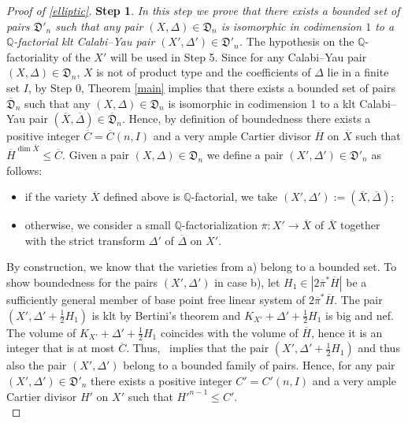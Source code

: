 \documentclass{amsart}[12pt,a4paper]
\theoremstyle{definition}
\begin{document}
\begin{proof}[Proof of \ref{elliptic}]
{\bf Step 1}. {\it In this step we prove that there exists a bounded set of pairs $\mathfrak{D}'_n$ such that any pair $(X, \Delta) \in \mathfrak{D}_n$ is isomorphic in codimension $1$ to a $\mathbb{Q}$-factorial klt Calabi--Yau pair $(X', \Delta') \in \mathfrak{D}'_n$.}
\newline
The hypothesis on the $\mathbb{Q}$-factoriality of the $X'$ will be used in Step 5.
\newline
Since for any Calabi--Yau pair $(X, \Delta) \in \mathfrak{D}_n$, $X$ is not of product type and the coefficients of $\Delta$ lie in a finite set $I$, by Step 0, Theorem \ref{main} implies that there exists a bounded set of pairs $\overline{\mathfrak{D}}_n$ such that any $(X, \Delta) \in \mathfrak{D}_n$ is isomorphic in codimension 1 to a klt Calabi--Yau pair $(\overline{X}, \overline{\Delta}) \in \overline{\mathfrak{D}}_n$.
Hence, by definition of boundedness there exists a positive integer $\overline{C} = \overline{C}(n, I)$ and a very ample Cartier divisor $\overline{H}$ on $\overline{X}$ such that $\overline{H}^{\dim \overline{X}} \leq \overline{C}$.
Given a pair $(X, \Delta) \in \mathfrak{D}_n$ we define a pair $(X', \Delta') \in \mathfrak{D}'_n$ as follows:
\begin{itemize}
\item[a)] if the variety $\overline{X}$ defined above is $\mathbb{Q}$-factorial, we take $(X', \Delta') := (\overline{X}, \overline{\Delta})$;
\item[b)] otherwise, we consider a small $\mathbb{Q}$-factorialization $\overline{\pi} \colon X' \to \overline{X}$ of $\overline{X}$ together with the strict transform $\Delta'$ of $\overline{\Delta}$ on $X'$.
\end{itemize}
By construction, we know that the varieties from a) belong to a bounded set.
To show boundedness for the pairs $(X', \Delta')$ in case b), let $H_1 \in |2\overline{\pi}^\ast\overline{H}|$ be a sufficiently general member of base point free linear system of $2\overline{\pi}^\ast\overline{H}$.
The pair $(X', \Delta' + \frac 1 2 H_1)$ is klt by Bertini's theorem and $K_{X'} +\Delta' + \frac 1 2 H_1$ is big and nef.
The volume of $K_{X'} +\Delta' + \frac 1 2 H_1$ coincides with the volume of $\overline{H}$, hence it is an integer that is at most $\overline{C}$.
Thus,~\cite[Theorem~6]{MST16} implies that the pair $(X', \Delta' + \frac 1 2 H_1)$ and thus also the pair $(X', \Delta')$ belong to a bounded family of pairs.
Hence, for any pair $(X', \Delta') \in \mathfrak{D}'_n$ there exists a positive integer $C' = C'(n, I)$ and a very ample Cartier divisor $H'$ on $X'$ such that $H'^{n-1} \leq C'$.\\


\end{proof}
\end{document}

